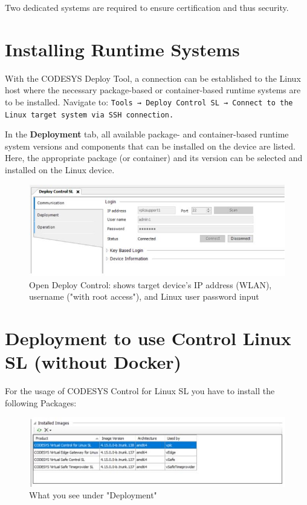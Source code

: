 \documentclass[a4paper,12pt]{article}
\begin{document}
Two dedicated systems are required to ensure certification and thus security.

\newpage
\section{Installing Runtime Systems}


With the CODESYS Deploy Tool, a connection can be established to the Linux host where the necessary package-based or container-based runtime systems are to be installed.  
Navigate to:  
\texttt{Tools → Deploy Control SL → Connect to the Linux target system via SSH connection.}


In the \textbf{Deployment} tab, all available package- and container-based runtime system versions and components that can be installed on the device are listed.  
Here, the appropriate package (or container) and its version can be selected and installed on the Linux device.

\begin{figure}[H]
	\centering
	\includegraphics[width=1\textwidth]{3.jpg}
	\caption{Open Deploy Control: shows target device's IP address (WLAN), username ("with root access"), and Linux user password input}
\end{figure}


\section{Deployment to use Control Linux SL (without Docker)}

For the usage of CODESYS Control for Linux SL you have to install the following Packages:

\begin{figure}[H]
	\centering
	\includegraphics[width=1\textwidth]{4.jpg}
	\caption{What you see under "Deployment"}
\end{figure}
\newpage
\end{document}
